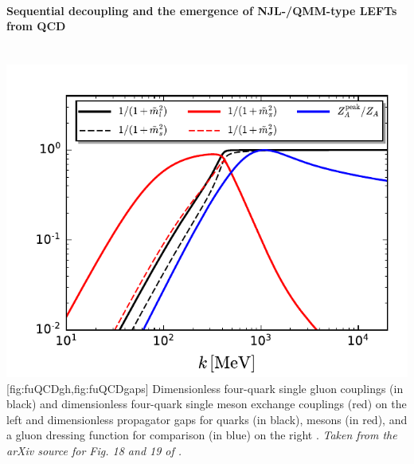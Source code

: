\paragraph{Sequential decoupling and the emergence of NJL-/QMM-type LEFTs from QCD}\label{paragraph:qcdDec}\mbox{}\\%
	{\includegraphics[width=\subcaptionFigureWidth]{qcd/figures/PhysRevD.101.054032Fig19noType3.pdf}} %
	[fig:fuQCDgh,fig:fuQCDgaps]
	{%
		Dimensionless four-quark single gluon couplings (in black) and dimensionless four-quark single meson exchange couplings (red) on the left  and
		dimensionless propagator gaps for quarks (in black), mesons (in red), and a gluon dressing function for comparison (in blue) on the right .
		\textit{Taken from the arXiv source for Fig. 18 and 19 of .}
	}%
